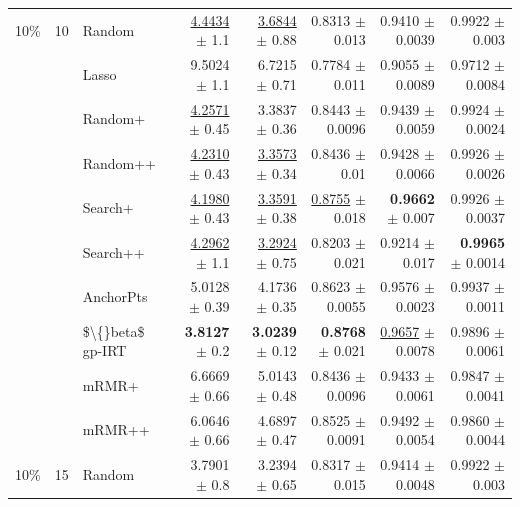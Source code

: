 \begin{longtable}{llp{}rrrrr}
\midrule
10\% & 10 & Random & \underline{4.4434} {\scriptsize $\pm$ 1.1} & \underline{3.6844} {\scriptsize $\pm$ 0.88} & 0.8313 {\scriptsize $\pm$ 0.013} & 0.9410 {\scriptsize $\pm$ 0.0039} & 0.9922 {\scriptsize $\pm$ 0.003} \\
 &  & Lasso & 9.5024 {\scriptsize $\pm$ 1.1} & 6.7215 {\scriptsize $\pm$ 0.71} & 0.7784 {\scriptsize $\pm$ 0.011} & 0.9055 {\scriptsize $\pm$ 0.0089} & 0.9712 {\scriptsize $\pm$ 0.0084} \\
 &  & Random+ & \underline{4.2571} {\scriptsize $\pm$ 0.45} & 3.3837 {\scriptsize $\pm$ 0.36} & 0.8443 {\scriptsize $\pm$ 0.0096} & 0.9439 {\scriptsize $\pm$ 0.0059} & 0.9924 {\scriptsize $\pm$ 0.0024} \\
 &  & Random++ & \underline{4.2310} {\scriptsize $\pm$ 0.43} & \underline{3.3573} {\scriptsize $\pm$ 0.34} & 0.8436 {\scriptsize $\pm$ 0.01} & 0.9428 {\scriptsize $\pm$ 0.0066} & 0.9926 {\scriptsize $\pm$ 0.0026} \\
 &  & Search+ & \underline{4.1980} {\scriptsize $\pm$ 0.43} & \underline{3.3591} {\scriptsize $\pm$ 0.38} & \underline{0.8755} {\scriptsize $\pm$ 0.018} & \textbf{0.9662} {\scriptsize $\pm$ 0.007} & 0.9926 {\scriptsize $\pm$ 0.0037} \\
 &  & Search++ & \underline{4.2962} {\scriptsize $\pm$ 1.1} & \underline{3.2924} {\scriptsize $\pm$ 0.75} & 0.8203 {\scriptsize $\pm$ 0.021} & 0.9214 {\scriptsize $\pm$ 0.017} & \textbf{0.9965} {\scriptsize $\pm$ 0.0014} \\
 &  & AnchorPts & 5.0128 {\scriptsize $\pm$ 0.39} & 4.1736 {\scriptsize $\pm$ 0.35} & 0.8623 {\scriptsize $\pm$ 0.0055} & 0.9576 {\scriptsize $\pm$ 0.0023} & 0.9937 {\scriptsize $\pm$ 0.0011} \\
 &  & \$\textbackslash\{\}beta\$ gp-IRT & \textbf{3.8127} {\scriptsize $\pm$ 0.2} & \textbf{3.0239} {\scriptsize $\pm$ 0.12} & \textbf{0.8768} {\scriptsize $\pm$ 0.021} & \underline{0.9657} {\scriptsize $\pm$ 0.0078} & 0.9896 {\scriptsize $\pm$ 0.0061} \\
 &  & mRMR+ & 6.6669 {\scriptsize $\pm$ 0.66} & 5.0143 {\scriptsize $\pm$ 0.48} & 0.8436 {\scriptsize $\pm$ 0.0096} & 0.9433 {\scriptsize $\pm$ 0.0061} & 0.9847 {\scriptsize $\pm$ 0.0041} \\
 &  & mRMR++ & 6.0646 {\scriptsize $\pm$ 0.66} & 4.6897 {\scriptsize $\pm$ 0.47} & 0.8525 {\scriptsize $\pm$ 0.0091} & 0.9492 {\scriptsize $\pm$ 0.0054} & 0.9860 {\scriptsize $\pm$ 0.0044} \\
\midrule
10\% & 15 & Random & 3.7901 {\scriptsize $\pm$ 0.8} & 3.2394 {\scriptsize $\pm$ 0.65} & 0.8317 {\scriptsize $\pm$ 0.015} & 0.9414 {\scriptsize $\pm$ 0.0048} & 0.9922 {\scriptsize $\pm$ 0.003} \\

\end{longtable}
